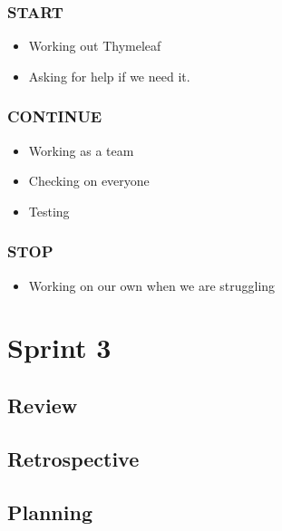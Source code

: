 \documentclass[]{report}
\begin{document}
			\subsection*{START}
				\begin{itemize}
					\item Working out Thymeleaf
					\item Asking for help if we need it.
				\end{itemize}
			\subsection*{CONTINUE}
				\begin{itemize}
					\item Working as a team
					\item Checking on everyone
					\item Testing
				\end{itemize}
			\subsection*{STOP}
				\begin{itemize}
					\item Working on our own when we are struggling
				\end{itemize}
	\chapter*{Sprint 3}
		\section*{Review}
		\section*{Retrospective}
		\section*{Planning}
\end{document}
